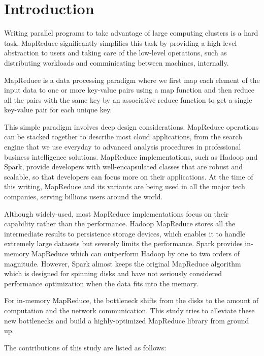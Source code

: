 \documentclass{sigkddExp}
\begin{document}
\section{Introduction}
\cite{dean2008mapreduce,chambers2010flumejava,dean2010mapreduce,zaharia2010spark,zaharia2016apache,davidson2013optimizing,xin2013graphx,meng2016mllib,shanahan2015large,ene2011fast}
Writing parallel programs to take advantage of large computing clusters is a hard task.
MapReduce significantly simplifies this task by providing a high-level abstraction to users and taking care of the low-level operations, such as distributing workloads and comminicating between machines, internally.


MapReduce is a data processing paradigm where we first map each element of the input data to one or more key-value pairs using a map function and then reduce all the pairs with the same key by an associative reduce function to get a single key-value pair for each unique key.

This simple paradigm involves deep design considerations. MapReduce operations can be stacked together to describe most cloud applications, from the search engine that we use everyday to advanced analysis procedures in professional business intelligence solutions. MapReduce implementations, such as Hadoop and Spark, provide developers with well-encapsulated classes that are robust and scalable, so that developers can focus more on their applications. At the time of this writing, MapReduce and its variants are being used in all the major tech companies, serving billions users around the world.

Although widely-used, most MapReduce implementations focus on their capability rather than the performance. Hadoop MapReduce stores all the intermediate results to persistence storage devices, which enables it to handle extremely large datasets but severely limits the performance. Spark provides in-memory MapReduce which can outperform Hadoop by one to two orders of magnitude. However, Spark almost keeps the original MapReduce algorithm which is designed for spinning disks and have not seriously considered performance optimization when the data fits into the memory.

For in-memory MapReduce, the bottleneck shifts from the disks to the amount of computation and the network communication. This study tries to alleviate these new bottlenecks and build a highly-optimized MapReduce library from ground up.

The contributions of this study are listed as follows:
\end{document}
